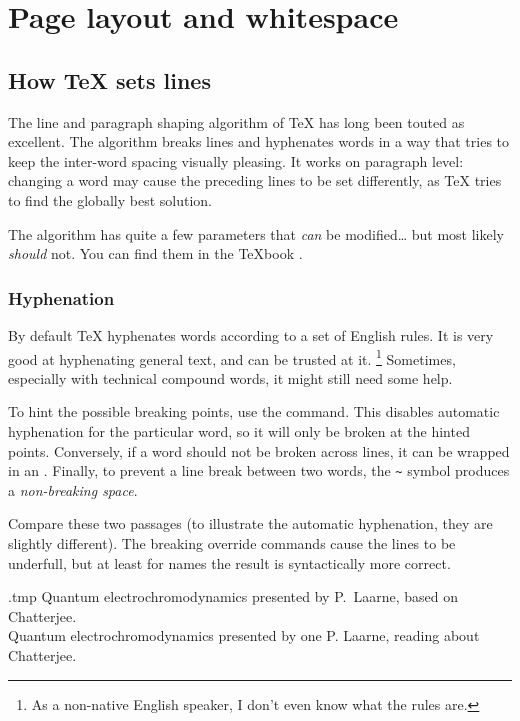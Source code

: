 \chapter{Page layout and whitespace}


%
%
%
\section{How \TeX{} sets lines}\label{sec:overfull}\label{sec:babel}

The line and paragraph shaping algorithm of \TeX{} has long been touted as excellent.
The algorithm breaks lines and hyphenates words in a way that tries to
keep the inter-word spacing visually pleasing.
It works on paragraph level: changing a word may cause the preceding lines to be set differently,
as \TeX{} tries to find the globally best solution.

\begin{technote}
The algorithm has quite a few parameters that \emph{can} be modified\dots{}
but most likely \emph{should} not.
You can find them in the TeXbook .
\end{technote}



%
%
\subsection{Hyphenation}
By default \TeX{} hyphenates words according to a set of English rules.
It is very good at hyphenating general text, and can be trusted at it.%
\footnote{As a non-native English speaker, I don't even know what the rules are.}
Sometimes, especially with technical compound words, it might still need some help.

To hint the possible breaking points, use the \cmd{-} command.
This disables automatic hyphenation for the particular word,
so it will only be broken at the hinted points.
Conversely, if a word should not be broken across lines, it can be wrapped in an .
Finally, to prevent a line break between two words,
the \verb|~| symbol produces a \emph{non-breaking space}.

Compare these two passages (to illustrate the automatic hyphenation, they are slightly different).
The breaking override commands cause the lines to be underfull,
but at least for names the result is syntactically more correct.
%
\begin{VerbatimOut}{\jobname.tmp}
Quantum electro\-chromo\-dynamics
presented by P.~Laarne,
based on \mbox{Chatterjee}.\\

Quantum electrochromodynamics
presented by one P. Laarne,
reading about Chatterjee.
\end{VerbatimOut}
\ShowExample

